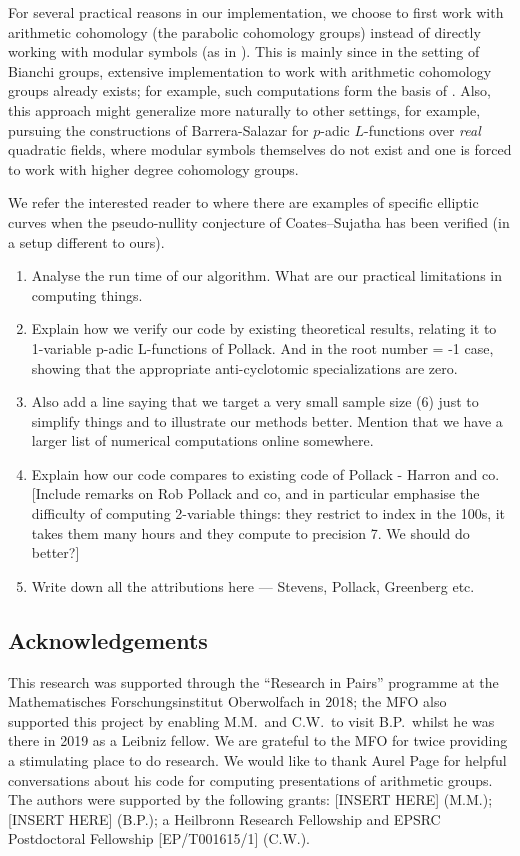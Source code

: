 \documentclass[a4paper,11pt]{article}
\numberwithin{equation}{section}
\begin{document}
For several practical reasons in our implementation, we choose to first work with arithmetic cohomology (the parabolic cohomology groups) instead of directly working with modular symbols (as in \cite{PS11,Gre07}). This is mainly since in the setting of Bianchi groups, extensive implementation to work with arithmetic cohomology groups already exists; for example, such computations form the basis of \cite{GMS15}. Also, this approach might generalize more naturally to other settings, for example, pursuing the constructions of Barrera-Salazar \cite{Bar15} for $p$-adic $L$-functions over \emph{real} quadratic fields, where modular symbols themselves do not exist and one is forced to work with higher degree cohomology groups.

We refer the interested reader to \cite{MR2287113,MR2830442,MR2916368,MR3440445,MR3810684} where there are examples of specific elliptic curves when the pseudo-nullity conjecture of Coates--Sujatha has been verified (in a setup different to ours).

\begin{enumerate}
\item Analyse the run time of our algorithm. What are our practical limitations in computing things.
\item Explain how we verify our code by existing theoretical results, relating it to 1-variable p-adic L-functions of Pollack. And in the root number = -1 case, showing that the appropriate anti-cyclotomic specializations are zero.
\item Also add a line saying that we target a very small sample size (6) just to simplify things and to illustrate our methods better. Mention that we have a larger list of numerical computations online somewhere.
\item Explain how our code compares to existing code of Pollack - Harron and co.
[Include remarks on Rob Pollack and co, and in particular emphasise the difficulty of computing 2-variable things: they restrict to index in the 100s, it takes them many hours and they compute to precision 7. We should do better?]
\item Write down all the attributions here --- Stevens, Pollack, Greenberg etc.
\end{enumerate}



\subsection*{Acknowledgements}
This research was supported through the ``Research in Pairs'' programme at the Mathematisches Forschungsinstitut Oberwolfach in 2018; the MFO also supported this project by enabling M.M.\ and C.W.\ to visit B.P.\ whilst he was there in 2019 as a Leibniz fellow. We are grateful to the MFO for twice providing a stimulating place to do research. We would like to thank Aurel Page for helpful conversations about his code for computing presentations of arithmetic groups. The authors were supported by the following grants: [INSERT HERE] (M.M.); [INSERT HERE] (B.P.); a Heilbronn Research Fellowship and EPSRC Postdoctoral Fellowship [EP/T001615/1] (C.W.).
\end{document}
